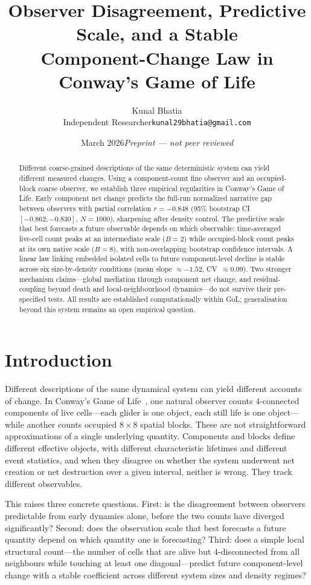 \documentclass[11pt,a4paper]{article}
\title{Observer Disagreement, Predictive Scale, and a Stable\\
       Component-Change Law in Conway's Game of Life}
\author{Kunal Bhatia\\
\small Independent Researcher\quad\texttt{kunal29bhatia@gmail.com}}
\date{March 2026\quad\textit{Preprint --- not peer reviewed}}
\begin{document}
\maketitle

\begin{abstract}
Different coarse-grained descriptions of the same deterministic system can
yield different measured changes.
Using a component-count fine observer and an occupied-block coarse observer,
we establish three empirical regularities in Conway's Game of Life.
Early component net change predicts the full-run normalized narrative gap
between observers with partial correlation $r=-0.848$
(95\% bootstrap CI $[-0.862,-0.830]$, $N=1000$), sharpening after density
control.
The predictive scale that best forecasts a future observable depends on which
observable: time-averaged live-cell count peaks at an intermediate scale
($B=2$) while occupied-block count peaks at its own native scale ($B=8$),
with non-overlapping bootstrap confidence intervals.
A linear law linking embedded isolated cells to future component-level decline
is stable across six size-by-density conditions
(mean slope $\approx-1.52$, CV~$\approx0.09$).
Two stronger mechanism claims---global mediation through component net change,
and residual-coupling beyond death and local-neighbourhood dynamics---do not
survive their pre-specified tests.
All results are established computationally within GoL; generalisation
beyond this system remains an open empirical question.
\end{abstract}

\section{Introduction}
\label{sec:intro}

Different descriptions of the same dynamical system can yield different
accounts of change.
In Conway's Game of Life~\citep{gardner1970}, one natural observer counts
4-connected components of live cells---each glider is one object, each still
life is one object---while another counts occupied $8\times8$ spatial blocks.
These are not straightforward approximations of a single underlying quantity.
Components and blocks define different effective objects, with different
characteristic lifetimes and different event statistics, and when they
disagree on whether the system underwent net creation or net destruction
over a given interval, neither is wrong.
They track different observables.

This raises three concrete questions.
First: is the disagreement between observers predictable from early dynamics
alone, before the two counts have diverged significantly?
Second: does the observation scale that best forecasts a future quantity
depend on which quantity one is forecasting?
Third: does a simple local structural count---the number of cells that are
alive but 4-disconnected from all neighbours while touching at least one
diagonal---predict future component-level change with a stable coefficient
across different system sizes and density regimes?
\end{document}
